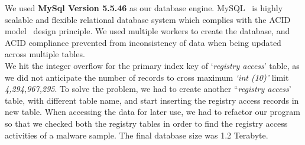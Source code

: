 We used \textbf{MySql Version 5.5.46} as our database engine. MySQL~\cite[]{mysql} is highly scalable and flexible relational database system which complies with the ACID model~\cite[]{acid} design principle.
We used multiple workers to create the database, and ACID compliance prevented from inconsistency of data when being updated across multiple tables.\\
We hit the integer overflow for the primary index key of `\emph{registry access}' table, as we did not anticipate the number of records to cross maximum \emph{`int (10)'} limit \emph{4,294,967,295}.
To solve the problem, we had to create another ``\emph{registry access}' table, with different table name, and start inserting the registry access records in new table.
When accessing the data for later use, we had to refactor our program so that we checked both the registry tables in order to find the registry access activities of a malware sample.
The final database size was 1.2 Terabyte.\\

